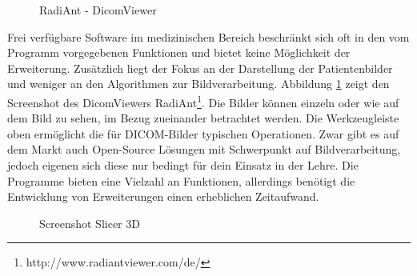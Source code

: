 \begin{figure}[htbp]
  \vspace{0.5cm}
  \centering
   \caption{RadiAnt - DicomViewer}
  \label{radiant}
  \vspace{0.5cm}
\end{figure}



Frei verfügbare Software im medizinischen Bereich beschränkt sich oft in den vom Programm vorgegebenen Funktionen und bietet keine Möglichkeit der Erweiterung. Zusätzlich liegt der Fokus an der Darstellung der Patientenbilder und weniger an den Algorithmen zur Bildverarbeitung. Abbildung \ref{radiant} zeigt den Screenshot des DicomViewers RadiAnt\footnote{http://www.radiantviewer.com/de/}. Die Bilder können einzeln oder wie auf dem Bild zu sehen, im Bezug zueinander betrachtet werden. Die Werkzeugleiste oben ermöglicht die für DICOM-Bilder typischen Operationen.
Zwar gibt es auf dem Markt auch Open-Source Lösungen mit Schwerpunkt auf Bildverarbeitung, jedoch eigenen sich diese nur bedingt für dein Einsatz in der Lehre. Die Programme bieten eine Vielzahl an Funktionen, allerdings benötigt die Entwicklung von Erweiterungen einen erheblichen Zeitaufwand.
 
\begin{figure}[htbp]
  \vspace{0.5cm}
  \centering
  \caption{Screenshot Slicer 3D}
  \label{slicer3d}
  \vspace{0.5cm}
\end{figure}

